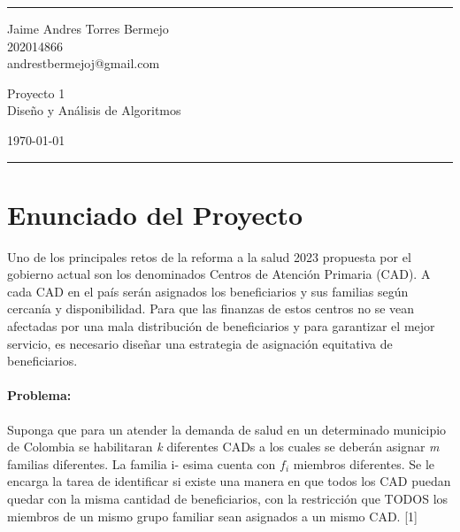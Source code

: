 \documentclass[a4paper]{article}
\begin{document}

\fancyhead[C]{}
\hrule \medskip %
\begin{minipage}{0.295\textwidth} 
\raggedright
\footnotesize
Jaime Andres Torres Bermejo \hfill\\   
202014866\hfill\\
andrestbermejoj@gmail.com
\end{minipage}
\begin{minipage}{0.4\textwidth} 
\centering 
\large 
Proyecto 1\\ 
\normalsize 
Diseño y Análisis de Algoritmos\\ 
\end{minipage}
\begin{minipage}{0.295\textwidth} 
\raggedleft
\today\hfill\\
\end{minipage}
\medskip\hrule 
\bigskip

\section{Enunciado del Proyecto}

Uno de los principales retos de la reforma a la salud 2023 propuesta por el gobierno actual son los
denominados Centros de Atención Primaria (CAD). A cada CAD en el país serán asignados los
beneficiarios y sus familias según cercanía y disponibilidad. Para que las finanzas de estos centros
no se vean afectadas por una mala distribución de beneficiarios y para garantizar el mejor servicio,
es necesario diseñar una estrategia de asignación equitativa de beneficiarios.

\paragraph{Problema:}
Suponga que para un atender la demanda de salud en un determinado municipio de Colombia se
habilitaran \textit{k} diferentes CADs a los cuales se deberán asignar \textit{m} familias diferentes. La familia i-
esima cuenta con \textit{$f_i$} miembros diferentes. Se le encarga la tarea de identificar si existe una manera
en que todos los CAD puedan quedar con la misma cantidad de beneficiarios, con la restricción que
TODOS los miembros de un mismo grupo familiar sean asignados a un mismo CAD. [1]

\end{document}
